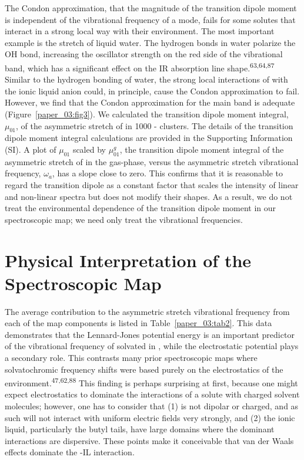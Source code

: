 The Condon approximation, that the magnitude of the transition dipole moment is independent of the vibrational frequency of a mode, fails for some solutes that interact in a strong local way with their environment. The most important example is the  stretch of liquid water. The hydrogen bonds in water polarize the OH bond, increasing the oscillator strength on the red side of the vibrational band, which has a significant effect on the IR absorption line shape.\textsuperscript{63,64,87} Similar to the hydrogen bonding of water, the strong local interactions of  with the ionic liquid anion could, in principle, cause the Condon approximation to fail. However, we find that the Condon approximation for the main band is adequate (Figure~\ref{paper_03:fig3}). We calculated the transition dipole moment integral, \(\mu_{01}\), of the asymmetric stretch of  in \num{1000} -\ce{[C4C1im][PF6]} clusters. The details of the transition dipole moment integral calculations are provided in the Supporting Information (SI). A plot of \(\mu_{01}\) scaled by \(\mu_{01}^{g}\), the transition dipole moment integral of the asymmetric stretch of  in the gas-phase, versus the asymmetric stretch vibrational frequency, \(\omega_{a}\), has a slope close to zero. This confirms that it is reasonable to regard the transition dipole as a constant factor that scales the intensity of linear and non-linear spectra but does not modify their shapes. As a result, we do not treat the environmental dependence of the transition dipole moment in our spectroscopic map; we need only treat the vibrational frequencies.

\section{Physical Interpretation of the Spectroscopic Map}
\label{paper_03:sec:IV}

The average contribution to the  asymmetric stretch vibrational frequency from each of the map components is listed in Table~\ref{paper_03:tab2}. This data demonstrates that the Lennard-Jones potential energy is an important predictor of the vibrational frequency of  solvated in \ce{[C4C1im][PF6]}, while the electrostatic potential plays a secondary role. This contrasts many prior spectroscopic maps where solvatochromic frequency shifts were based purely on the electrostatics of the environment.\textsuperscript{47,62,88} This finding is perhaps surprising at first, because one might expect electrostatics to dominate the interactions of a solute with charged solvent molecules; however, one has to consider that (1)  is not dipolar or charged, and as such will not interact with uniform electric fields very strongly, and (2) the ionic liquid, particularly the \ce{[C4C1im]+} butyl tails, have large domains where the dominant interactions are dispersive. These points make it conceivable that van der Waals effects dominate the -IL interaction.

